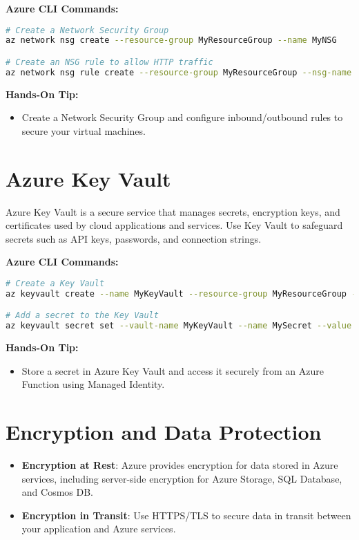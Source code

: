 \documentclass{article}
\begin{document}
\textbf{Azure CLI Commands:}
\begin{lstlisting}[language=bash]
# Create a Network Security Group
az network nsg create --resource-group MyResourceGroup --name MyNSG

# Create an NSG rule to allow HTTP traffic
az network nsg rule create --resource-group MyResourceGroup --nsg-name MyNSG --name AllowHTTP --protocol tcp --priority 100 --destination-port-range 80 --access allow
\end{lstlisting}

\textbf{Hands-On Tip:}
\begin{itemize}
    \item Create a Network Security Group and configure inbound/outbound rules to secure your virtual machines.
\end{itemize}

\section{Azure Key Vault}
Azure Key Vault is a secure service that manages secrets, encryption keys, and certificates used by cloud applications and services. Use Key Vault to safeguard secrets such as API keys, passwords, and connection strings.

\textbf{Azure CLI Commands:}
\begin{lstlisting}[language=bash]
# Create a Key Vault
az keyvault create --name MyKeyVault --resource-group MyResourceGroup --location eastus

# Add a secret to the Key Vault
az keyvault secret set --vault-name MyKeyVault --name MySecret --value "SecretValue"
\end{lstlisting}

\textbf{Hands-On Tip:}
\begin{itemize}
    \item Store a secret in Azure Key Vault and access it securely from an Azure Function using Managed Identity.
\end{itemize}

\section{Encryption and Data Protection}
\begin{itemize}
    \item \textbf{Encryption at Rest}: Azure provides encryption for data stored in Azure services, including server-side encryption for Azure Storage, SQL Database, and Cosmos DB.
    \item \textbf{Encryption in Transit}: Use HTTPS/TLS to secure data in transit between your application and Azure services.
\end{itemize}
\end{document}
